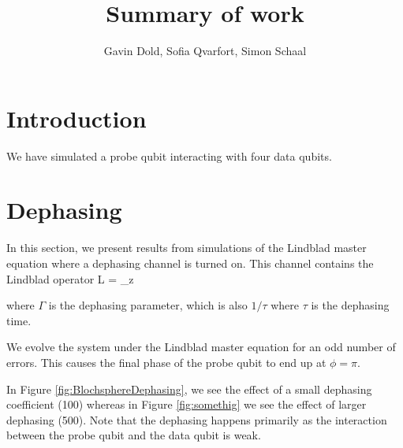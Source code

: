


\usepackage{url}
\usepackage{amsmath}
\usepackage{graphicx}
\usepackage[font=footnotesize]{caption}
\usepackage{subcaption}
\usepackage[]{microtype}
\usepackage{balance}
\usepackage{cite}
\usepackage{braket}
\usepackage{braket}
\usepackage{siunitx}


\title{Summary of work}
\author{Gavin Dold, Sofia Qvarfort, Simon Schaal}
\maketitle
\tableofcontents
\section{Introduction}
We have simulated a probe qubit interacting with four data qubits. 


\section{Dephasing}
In this section, we present results from simulations of the Lindblad master equation where a dephasing channel is turned on. This channel contains the Lindblad operator
\beq
L  = \sqrt{\Gamma} \sigma_z
\eeq

where $\Gamma$ is the dephasing parameter, which is also $1/\tau$ where $\tau$ is the dephasing time. 

We evolve the system under the Lindblad master equation for an odd number of errors. This causes the final phase of the probe qubit to end up at $\phi = \pi$. 

In Figure \ref{fig:BlochsphereDephasing}, we see the effect of a small dephasing coefficient (100) whereas in Figure \ref{fig:somethig} we see the effect of larger dephasing (500). Note that the dephasing happens primarily as the interaction between the probe qubit and the data qubit is weak. 



